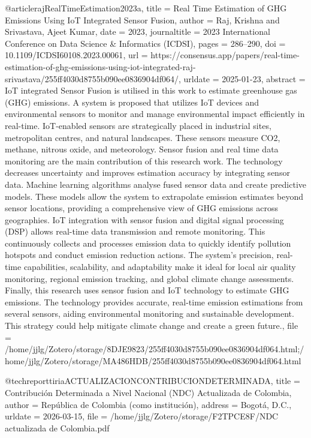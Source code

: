 {{{{@article{rajRealTimeEstimation2023a,
  title = {Real {{Time Estimation}} of {{GHG Emissions Using IoT Integrated Sensor Fusion}}},
  author = {Raj, Krishna and Srivastava, Ajeet Kumar},
  date = {2023},
  journaltitle = {2023 International Conference on Data Science \& Informatics (ICDSI)},
  pages = {286--290},
  doi = {10.1109/ICDSI60108.2023.00061},
  url = {https://consensus.app/papers/real-time-estimation-of-ghg-emissions-using-iot-integrated-raj-srivastava/255ff4030d8755b090ee0836904df064/},
  urldate = {2025-01-23},
  abstract = {IoT integrated Sensor Fusion is utilised in this work to estimate greenhouse gas (GHG) emissions. A system is proposed that utilizes IoT devices and environmental sensors to monitor and manage environmental impact efficiently in real-time. IoT-enabled sensors are strategically placed in industrial sites, metropolitan centres, and natural landscapes. These sensors measure CO2, methane, nitrous oxide, and meteorology. Sensor fusion and real time data monitoring are the main contribution of this research work. The technology decreases uncertainty and improves estimation accuracy by integrating sensor data. Machine learning algorithms analyse fused sensor data and create predictive models. These models allow the system to extrapolate emission estimates beyond sensor locations, providing a comprehensive view of GHG emissions across geographies. IoT integration with sensor fusion and digital signal processing (DSP) allows real-time data transmission and remote monitoring. This continuously collects and processes emission data to quickly identify pollution hotspots and conduct emission reduction actions. The system's precision, real-time capabilities, scalability, and adaptability make it ideal for local air quality monitoring, regional emission tracking, and global climate change assessments. Finally, this research uses sensor fusion and IoT technology to estimate GHG emissions. The technology provides accurate, real-time emission estimations from several sensors, aiding environmental monitoring and sustainable development. This strategy could help mitigate climate change and create a green future.},
  file = {/home/jjlg/Zotero/storage/8DJE9823/255ff4030d8755b090ee0836904df064.html;/home/jjlg/Zotero/storage/MA486HDB/255ff4030d8755b090ee0836904df064.html}
}

@techreport{tiriaACTUALIZACIONCONTRIBUCIONDETERMINADA,
  title = {Contribuci\'on {{Determinada}} a {{Nivel Nacional}} ({{NDC}}) Actualizada de {{Colombia}}},
  author = {{Rep\'ublica de Colombia (como instituci\'on)}},
  address = {Bogot\'a, D.C.},
  urldate = {2026-03-15},
  file = {/home/jjlg/Zotero/storage/F2TPCE8F/NDC actualizada de Colombia.pdf}
}

}}}}
